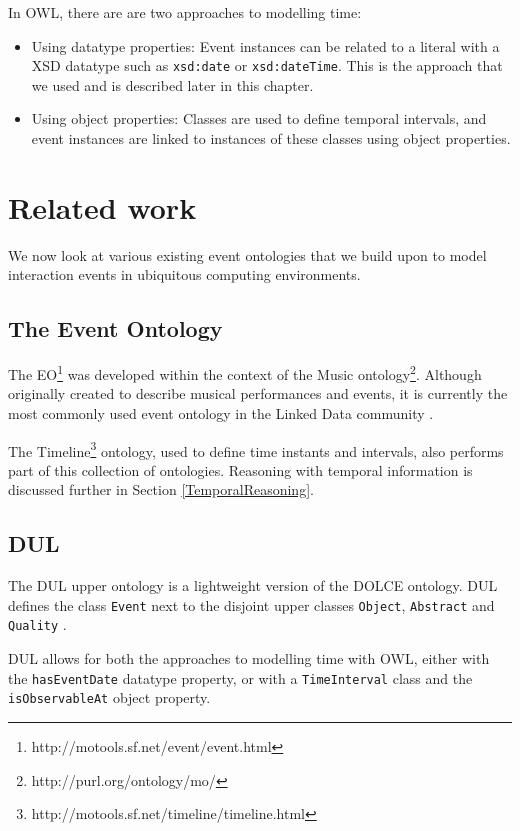 

In \ac{OWL}, there are are two approaches to modelling time:

\begin{itemize}
	\item Using datatype properties: Event instances can be related to a literal with a \ac{XSD} datatype such as \texttt{xsd:date} or \texttt{xsd:dateTime}. This is the approach that we used and is described later in this chapter.
	\item Using object properties: Classes are used to define temporal intervals, and event instances are linked to instances of these classes using object properties.
\end{itemize}


\section{Related work}
We now look at various existing event ontologies that we build upon to model interaction events in ubiquitous computing environments.

\subsection{The Event Ontology}
The \ac{EO}\footnote{http://motools.sf.net/event/event.html} was developed within the context of the Music ontology\footnote{http://purl.org/ontology/mo/}. Although originally created to describe musical performances and events, it is currently the most commonly used event ontology in the Linked Data community \cite{Shaw2009}.

The Timeline\footnote{http://motools.sf.net/timeline/timeline.html} ontology, used to define time instants and intervals, also performs part of this collection of ontologies. Reasoning with temporal information is discussed further in Section \ref{TemporalReasoning}.  

\subsection{DUL}

The \ac{DUL} upper ontology is a lightweight version of the \ac{DOLCE} ontology. \ac{DUL} defines the class \texttt{Event} next to the disjoint upper classes \texttt{Object}, \texttt{Abstract} and \texttt{Quality} \cite{Scherp2011}.

\ac{DUL} allows for both the approaches to modelling time with \ac{OWL}, either with the \texttt{hasEventDate} datatype property, or with a \texttt{TimeInterval} class and the \texttt{isObservableAt} object property.

